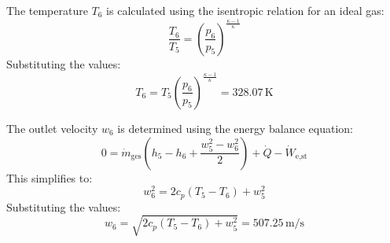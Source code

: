 The temperature \( T_6 \) is calculated using the isentropic relation for an ideal gas:  
\[
\frac{T_6}{T_5} = \left( \frac{p_6}{p_5} \right)^{\frac{\kappa - 1}{\kappa}}
\]  
Substituting the values:  
\[
T_6 = T_5 \left( \frac{p_6}{p_5} \right)^{\frac{\kappa - 1}{\kappa}} = 328.07 \, \text{K}
\]  

The outlet velocity \( w_6 \) is determined using the energy balance equation:  
\[
0 = \dot{m}_{\text{ges}} \left( h_5 - h_6 + \frac{w_5^2 - w_6^2}{2} \right) + \dot{Q} - \dot{W}_{\text{e,st}}
\]  
This simplifies to:  
\[
w_6^2 = 2 c_p (T_5 - T_6) + w_5^2
\]  
Substituting the values:  
\[
w_6 = \sqrt{2 c_p (T_5 - T_6) + w_5^2} = 507.25 \, \text{m/s}
\]